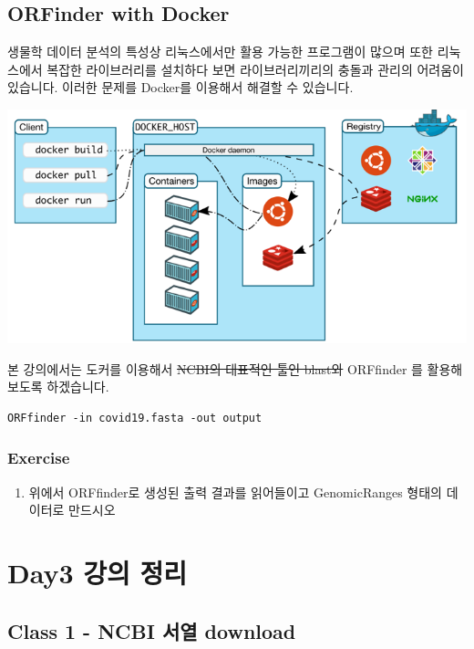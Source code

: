\documentclass[
]{book}
\providecommand{\tightlist}{%
  \setlength{\itemsep}{0pt}\setlength{\parskip}{0pt}}
\begin{document}
\hypertarget{orfinder-with-docker}{%
\section{ORFinder with Docker}\label{orfinder-with-docker}}

생물학 데이터 분석의 특성상 리눅스에서만 활용 가능한 프로그램이 많으며 또한 리눅스에서 복잡한 라이브러리를 설치하다 보면 라이브러리끼리의 충돌과 관리의 어려움이 있습니다. 이러한 문제를 Docker를 이용해서 해결할 수 있습니다.

\includegraphics{docker.PNG}

본 강의에서는 도커를 이용해서 \sout{NCBI의 대표적인 툴인 blast와} ORFfinder 를 활용해보도록 하겠습니다.

\begin{verbatim}
ORFfinder -in covid19.fasta -out output
\end{verbatim}

\hypertarget{exercise-10}{%
\subsection{Exercise}\label{exercise-10}}

\begin{enumerate}
\def\labelenumi{\arabic{enumi}.}
\tightlist
\item
  위에서 ORFfinder로 생성된 출력 결과를 읽어들이고 GenomicRanges 형태의 데이터로 만드시오
\end{enumerate}

\hypertarget{day3-uxac15uxc758-uxc815uxb9ac}{%
\chapter{Day3 강의 정리}\label{day3-uxac15uxc758-uxc815uxb9ac}}

\hypertarget{day3_class1}{%
\section{Class 1 - NCBI 서열 download}\label{day3_class1}}
\end{document}
